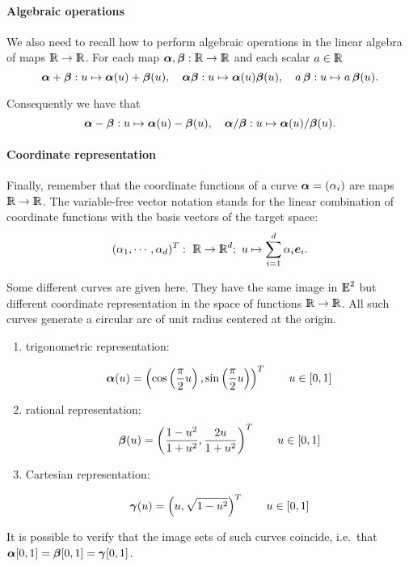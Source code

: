 \documentclass{31x47jw}
\begin{document}
\paragraph{Algebraic operations}

We also need to recall how to perform algebraic operations in the
linear algebra of maps $\mathbb{I\!\!R}\rightarrow\mathbb{I\!\!R}$.  For each map
${\mbox{\boldmath $\alpha$}},{\mbox{\boldmath $\beta$}}: \mathbb{I\!\!R}\rightarrow\mathbb{I\!\!R}$ and each scalar $a\in\mathbb{I\!\!R}$
\[
{\mbox{\boldmath $\alpha$}} + {\mbox{\boldmath $\beta$}}: u \mapsto {\mbox{\boldmath $\alpha$}}(u) + {\mbox{\boldmath $\beta$}}(u),
\quad 
{\mbox{\boldmath $\alpha$}}  {\mbox{\boldmath $\beta$}} : u \mapsto {\mbox{\boldmath $\alpha$}}(u)  {\mbox{\boldmath $\beta$}}(u), 
\quad
a\,{\mbox{\boldmath $\beta$}} : u \mapsto a\,{\mbox{\boldmath $\beta$}}(u).
\]

Consequently we have that
\[
{\mbox{\boldmath $\alpha$}} - {\mbox{\boldmath $\beta$}} : u \mapsto {\mbox{\boldmath $\alpha$}}(u) - {\mbox{\boldmath $\beta$}}(u),
\quad 
{\mbox{\boldmath $\alpha$}} / {\mbox{\boldmath $\beta$}} : u \mapsto {\mbox{\boldmath $\alpha$}}(u) / {\mbox{\boldmath $\beta$}} (u).
\]

\paragraph{Coordinate representation}

Finally, remember that the coordinate functions of a curve ${\mbox{\boldmath $\alpha$}}
= (\alpha_{i})$ are maps $\mathbb{I\!\!R}\rightarrow\mathbb{I\!\!R}$.  The variable-free
vector notation stands for the linear combination of coordinate
functions with the basis vectors of the target space:
\[
({\alpha}_{1}, \cdots, {\alpha}_{d})^{T}:\
\mathbb{I\!\!R}\rightarrow\mathbb{I\!\!R}^{d} ;\ u \mapsto
\sum_{i=1}^{d} {\alpha}_{i} {\mbox{\boldmath $e$}}_{i}.
\]


\begin{example}
\label{ex:circumference}
Some different curves are given here.  They have the same image in $
\mathbb{I\!\!E}^{2}$ but different coordinate representation in the space of
functions $\mathbb{I\!\!R}\rightarrow\mathbb{I\!\!R}$.  All such curves generate a circular arc
of unit radius centered at the origin.

\begin{enumerate}
    
\item  trigonometric representation:

\[
{\mbox{\boldmath $\alpha$}}(u) = \left(\cos \left({\pi \over 2}u\right), \sin \left({\pi \over
2}u\right)\right)^T \qquad u\in[0,1]
\]

\item  rational representation:
\[
{\mbox{\boldmath $\beta$}}(u) = \left({1-u^2 \over 1+u^2}, {2u \over 1+u^2}\right)^T
\qquad u\in[0,1]
\]


\item  Cartesian representation:

\[
{\mbox{\boldmath $\gamma$}}(u) = \left(u, \sqrt{1-u^2}\right)^T
\qquad u\in[0,1]
\]

\end{enumerate}

It is possible to verify that the image sets of such curves coincide, 
i.e.~that ${\mbox{\boldmath $\alpha$}}[0,1]={\mbox{\boldmath $\beta$}}[0,1]={\mbox{\boldmath $\gamma$}}[0,1]$.

\end{example}
\end{document}
